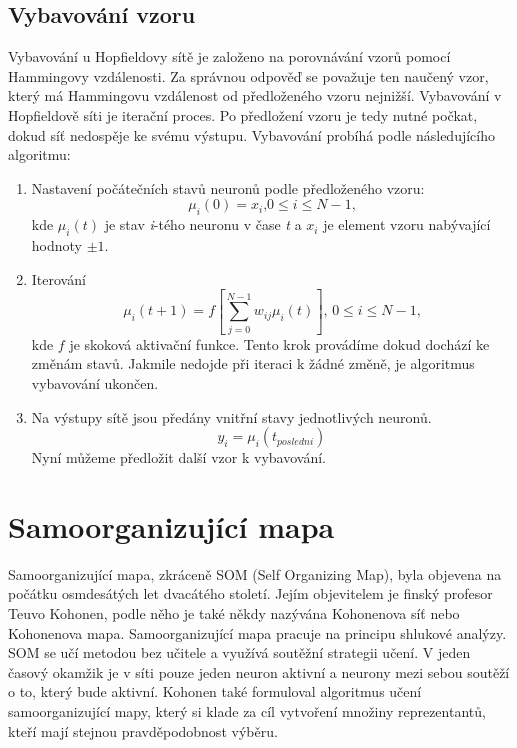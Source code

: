 \documentclass[11pt,twoside,a4paper]{book}
\begin{document}
\subsection{Vybavování vzoru}
Vybavování u Hopfieldovy sítě je založeno na porovnávání vzorů pomocí Hammingovy vzdálenosti. Za správnou odpověď se považuje ten naučený vzor, který má Hammingovu vzdálenost od předloženého vzoru nejnižší.
Vybavování v Hopfieldově síti je iterační proces. Po předložení vzoru je tedy nutné počkat, dokud síť nedospěje ke svému výstupu.
Vybavování probíhá podle následujícího algoritmu\cite{skripta}:
\begin{enumerate}
\item Nastavení počátečních stavů neuronů podle předloženého vzoru:
\begin{equation}
\mu_{i}(0)=x_{i}\mbox{,}0\leq i\leq N-1 \mbox{,}
\end{equation}
kde $\mu_{i}(t)$ je stav \textit{i}-tého neuronu v čase \textit{t} a $x_{i}$ je element vzoru nabývající hodnoty $\pm 1$.
\item Iterování 
\begin{equation}
\mu_{i}(t+1)=f\left[\sum\limits_{j=0}^{N-1}w_{ij}\mu_{i}(t) \right]\mbox{, }0\leq i\leq N-1 \mbox{,}
\end{equation}
kde $f$ je skoková aktivační funkce. Tento krok provádíme dokud dochází ke změnám stavů. Jakmile nedojde při iteraci k žádné změně, je algoritmus vybavování ukončen.
\item Na výstupy sítě jsou předány vnitřní stavy jednotlivých neuronů.
\begin{equation}
y_{i}=\mu_{i}(t_{posledni})
\end{equation}
Nyní můžeme předložit další vzor k vybavování.
\end{enumerate}
\section{Samoorganizující mapa}
Samoorganizující mapa, zkráceně SOM (Self Organizing Map), byla objevena na počátku osmdesátých let dvacátého století. Jejím objevitelem je finský profesor Teuvo Kohonen, podle něho je také někdy nazývána Kohonenova síť nebo Kohonenova mapa. Samoorganizující mapa pracuje na principu shlukové analýzy. SOM se učí metodou bez učitele a využívá soutěžní strategii učení. V jeden časový okamžik je v síti pouze jeden neuron aktivní a neurony mezi sebou soutěží o to, který bude aktivní. Kohonen také formuloval algoritmus učení samoorganizující mapy, který si klade za cíl vytvoření množiny reprezentantů, kteří mají stejnou pravděpodobnost výběru.\cite{teoret} 
\end{document}
